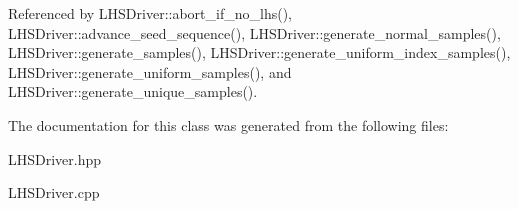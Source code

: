 


Referenced by L\+H\+S\+Driver\+::abort\+\_\+if\+\_\+no\+\_\+lhs(), L\+H\+S\+Driver\+::advance\+\_\+seed\+\_\+sequence(), L\+H\+S\+Driver\+::generate\+\_\+normal\+\_\+samples(), L\+H\+S\+Driver\+::generate\+\_\+samples(), L\+H\+S\+Driver\+::generate\+\_\+uniform\+\_\+index\+\_\+samples(), L\+H\+S\+Driver\+::generate\+\_\+uniform\+\_\+samples(), and L\+H\+S\+Driver\+::generate\+\_\+unique\+\_\+samples().



The documentation for this class was generated from the following files\+:\begin{DoxyCompactItemize}
\item 
L\+H\+S\+Driver.\+hpp\item 
L\+H\+S\+Driver.\+cpp\end{DoxyCompactItemize}
